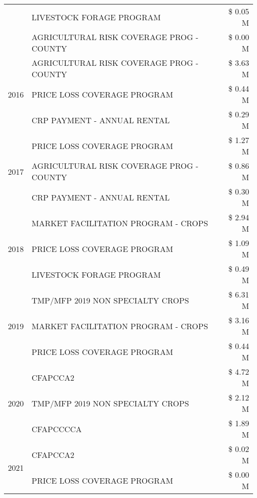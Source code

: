 \begin{tabular}{llr}
 & LIVESTOCK FORAGE PROGRAM & \$ 0.05 M \\
 & AGRICULTURAL RISK COVERAGE PROG - COUNTY & \$ 0.00 M \\
\cline{1-3}
\multirow[t]{3}{*}{2016} & AGRICULTURAL RISK COVERAGE PROG - COUNTY & \$ 3.63 M \\
 & PRICE LOSS COVERAGE PROGRAM & \$ 0.44 M \\
 & CRP PAYMENT - ANNUAL RENTAL & \$ 0.29 M \\
\cline{1-3}
\multirow[t]{3}{*}{2017} & PRICE LOSS COVERAGE PROGRAM & \$ 1.27 M \\
 & AGRICULTURAL RISK COVERAGE PROG - COUNTY & \$ 0.86 M \\
 & CRP PAYMENT - ANNUAL RENTAL & \$ 0.30 M \\
\cline{1-3}
\multirow[t]{3}{*}{2018} & MARKET FACILITATION PROGRAM - CROPS & \$ 2.94 M \\
 & PRICE LOSS COVERAGE PROGRAM & \$ 1.09 M \\
 & LIVESTOCK FORAGE PROGRAM & \$ 0.49 M \\
\cline{1-3}
\multirow[t]{3}{*}{2019} & TMP/MFP 2019 NON SPECIALTY CROPS & \$ 6.31 M \\
 & MARKET FACILITATION PROGRAM - CROPS & \$ 3.16 M \\
 & PRICE LOSS COVERAGE PROGRAM & \$ 0.44 M \\
\cline{1-3}
\multirow[t]{3}{*}{2020} & CFAPCCA2 & \$ 4.72 M \\
 & TMP/MFP 2019 NON SPECIALTY CROPS & \$ 2.12 M \\
 & CFAPCCCCA & \$ 1.89 M \\
\cline{1-3}
\multirow[t]{2}{*}{2021} & CFAPCCA2 & \$ 0.02 M \\
 & PRICE LOSS COVERAGE PROGRAM & \$ 0.00 M \\
\cline{1-3}
\bottomrule
\end{tabular}
